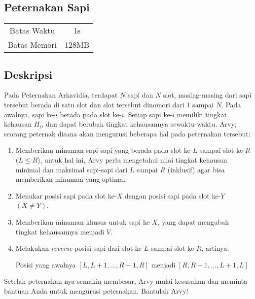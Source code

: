 \documentclass{article}
\begin{document}
\begin{center}
    \section*{Peternakan Sapi} %

    \begin{tabular}{ | c c | }
        \hline
        Batas Waktu  & 1s \\    %
        Batas Memori & 128MB \\  %
        \hline
    \end{tabular}
\end{center}

\subsection*{Deskripsi}

Pada Peternakan Arkavidia, terdapat $N$ sapi dan $N$ slot, masing-masing dari sapi tersebut berada di satu slot dan slot tersebut dinomori dari $1$ sampai $N$. Pada awalnya, sapi ke-$i$ berada pada slot ke-$i$. Setiap sapi ke-$i$ memiliki tingkat kehausan $H_i$, dan dapat berubah tingkat kehausannya sewaktu-waktu. Arvy, seorang peternak disana akan mengurusi beberapa hal pada peternakan tersebut:

\begin{enumerate}
\item Memberikan minuman sapi-sapi yang berada pada slot ke-$L$ sampai slot ke-$R$ ($L \leq R$), untuk hal ini, Arvy perlu mengetahui nilai tingkat kehausan minimal dan maksimal sapi-sapi dari $L$ sampai $R$ (inklusif) agar bisa memberikan minuman yang optimal.
\item Menukar posisi sapi pada slot ke-$X$ dengan posisi sapi pada slot ke-$Y$ $(X \neq Y)$.
\item Memberikan minuman khusus untuk sapi ke-$X$, yang dapat mengubah tingkat kehausannya menjadi $V$.
\item Melakukan \textit{reverse} posisi sapi dari slot ke-$L$ sampai slot ke-$R$, artinya:

\begin{center}
Posisi yang awalnya $\left[L, L + 1, \dots, R - 1, R\right]$ menjadi $\left[R, R - 1, \dots, L + 1, L\right]$
\end{center}
\end{enumerate}

Setelah peternakan-nya semakin membesar, Arvy mulai kesusahan dan meminta bantuan Anda untuk mengurusi peternakan. Bantulah Arvy!
\end{document}
